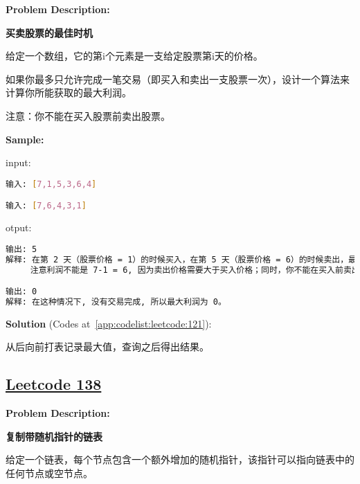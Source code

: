 \textbf{Problem Description:}\par

\textbf{买卖股票的最佳时机}\par

给定一个数组，它的第i个元素是一支给定股票第i天的价格。\par

如果你最多只允许完成一笔交易（即买入和卖出一支股票一次），设计一个算法来计算你所能获取的最大利润。\par

注意：你不能在买入股票前卖出股票。\par


\textbf{Sample:}\par

input:\par

\begin{lstlisting}[language=bash]
输入: [7,1,5,3,6,4]

输入: [7,6,4,3,1]
\end{lstlisting}

otput:\par

\begin{lstlisting}[language=bash]
输出: 5
解释: 在第 2 天（股票价格 = 1）的时候买入，在第 5 天（股票价格 = 6）的时候卖出，最大利润 = 6-1 = 5 。
     注意利润不能是 7-1 = 6, 因为卖出价格需要大于买入价格；同时，你不能在买入前卖出股票。

输出: 0
解释: 在这种情况下, 没有交易完成, 所以最大利润为 0。
\end{lstlisting}

\textbf{Solution }(Codes at~\ref{app:codelist:leetcode:121}):\par

从后向前打表记录最大值，查询之后得出结果。\par



\subsection{\href{https://leetcode-cn.com/}{Leetcode 138}}\label{app:problemlist:leetcode:138}

\textbf{Problem Description:}\par

\textbf{复制带随机指针的链表}\par

给定一个链表，每个节点包含一个额外增加的随机指针，该指针可以指向链表中的任何节点或空节点。\par

